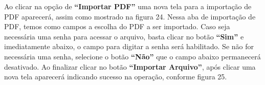 \begin{center}
\begin{minipage}{\textwidth}
            \label{fig:figura23}
        \end{minipage}
    \end{center}     

Ao clicar na opção de \textbf{“Importar PDF”} uma nova tela para a importação de PDF aparecerá, assim como mostrado na figura 24. Nessa aba de importação de PDF, temos como campos a escolha do PDF a ser importado. Caso seja necessária uma senha para acessar o arquivo, basta clicar no botão \textbf{“Sim”} e imediatamente abaixo, o campo para digitar a senha será habilitado. Se não for necessária uma senha, selecione o botão \textbf{“Não”} que o campo abaixo permanecerá desativado. Ao finalizar clicar no botão \textbf{“Importar Arquivo”}, após clicar uma nova tela aparecerá indicando sucesso na operação, conforme figura 25. 

